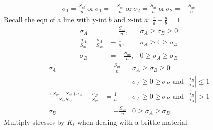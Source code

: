 \vspace{-10pt}
\begin{align*}
    \sigma_1 = \frac{S_{ut}}{n}\ \text{or}\ \sigma_1=-\frac{S_{uc}}{n}\  \text{or} \ \sigma_2=\frac{S_{ut}}{n}\ \text{or} \ \sigma_2=-\frac{S_{uc}}{n}
\end{align*}
Recall the eqn of a line with y-int $b$ and x-int $a$: $\frac{x}{a}+\frac{y}{b} = 1$
\begin{align*}
    \sigma_A&=\frac{S_{ut}}{n}, &\sigma_A\geq \sigma_B \geq 0\\
    \frac{\sigma_A}{S_{ut}}-\frac{\sigma_A}{S_{uc}}&=\frac{1}{n}, &\sigma_A\geq  0\geq \sigma_B\\
    \sigma_B&=-\frac{S_{uc}}{n}, &0\geq \sigma_A\geq \sigma_B 
\end{align*}
\vspace{-12pt}
\begin{align*}
    \sigma_A&=\frac{S_{ut}}{n} &\sigma_A \geq \sigma_B \geq 0 \\
     &&\sigma_A \geq 0 \geq \sigma_B\text{  and  } \left|\frac{\sigma_B}{\sigma_A}\right|\leq 1\\
    \frac{(S_{uc}-S_{ut})\sigma_A}{S_{uc}S_{ut}}-\frac{\sigma_B}{S_{uc}}&=\frac{1}{n} &\sigma_A \geq 0 \geq \sigma_B\text{  and  }\left|\frac{\sigma_B}{\sigma_A}\right|> 1\\
    \sigma_B &=-\frac{S_{uc}}{n} &0\geq \sigma_A \geq \sigma_B
    \end{align*}
Multiply stresses by $K_t$ when dealing with a brittle material